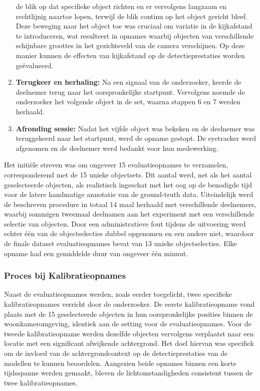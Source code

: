 \begin{enumerate}
  de blik op dat specifieke object richten en er vervolgens langzaam en rechtlijnig naartoe lopen, 
  terwijl de blik continu op het object gericht bleef. 
  Deze beweging naar het object toe was cruciaal om variatie in de kijkafstand te introduceren, 
  wat resulteert in opnames waarbij objecten van verschillende schijnbare groottes in het gezichtsveld van de camera verschijnen. 
  Op deze manier kunnen de effecten van kijkafstand op de detectieprestaties worden geëvalueerd.
  \item \textbf{Terugkeer en herhaling:} Na een signaal van de onderzoeker, keerde de deelnemer terug naar het oorspronkelijke startpunt. 
  Vervolgens noemde de onderzoeker het volgende object in de set, waarna stappen 6 en 7 werden herhaald.
  \item \textbf{Afronding sessie:} Nadat het vijfde object was bekeken en de deelnemer was teruggekeerd naar het startpunt, 
  werd de opname gestopt. De eyetracker werd afgenomen en de deelnemer werd bedankt voor hun medewerking.
\end{enumerate}

Het initiële streven was om ongeveer 15 evaluatieopnames te verzamelen, corresponderend met de 15 unieke objectsets. 
Dit aantal werd, net als het aantal geselecteerde objecten, als realistisch ingeschat met het oog op de benodigde tijd voor de 
latere handmatige annotatie van de ground-truth data. 
Uiteindelijk werd de beschreven procedure in totaal 14 maal herhaald met verschillende deelnemers, 
waarbij sommigen tweemaal deelnamen aan het experiment met een verschillende selectie van objecten. 
Door een administratieve fout tijdens de uitvoering werd echter één van de objectselecties dubbel opgenomen en een andere niet, 
waardoor de finale dataset evaluatieopnames bevat van 13 unieke objectselecties. 
Elke opname had een gemiddelde duur van ongeveer één minuut.

\subsubsection{Proces bij Kalibratieopnames}

Naast de evaluatieopnames werden, zoals eerder toegelicht, twee specifieke kalibratieopnames verricht door de onderzoeker.
De eerste kalibratieopname vond plaats met de 15 geselecteerde objecten in hun oorspronkelijke posities binnen de woonkameromgeving, 
identiek aan de setting voor de evaluatieopnames. 
Voor de tweede kalibratieopname werden dezelfde objecten vervolgens verplaatst naar een locatie met een significant afwijkende achtergrond. 
Het doel hiervan was specifiek om de invloed van de achtergrondcontext op de detectieprestaties van de modellen te kunnen beoordelen.
Aangezien beide opnames binnen een korte tijdsspanne werden gemaakt, bleven de lichtomstandigheden consistent tussen de twee kalibratieopnames.

